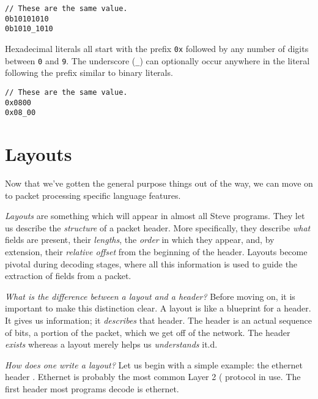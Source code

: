 \begin{codepage}
\begin{lstlisting}
// These are the same value.
0b10101010
0b1010_1010
\end{lstlisting}
\end{codepage}

Hexadecimal literals all start with the prefix \texttt{0x} followed by any number of digits between \texttt{0} and \texttt{9}. The underscore (\texttt{\_}) can optionally occur anywhere in the literal following the prefix similar to binary literals.

\begin{codepage}
\begin{lstlisting}
// These are the same value.
0x0800
0x08_00
\end{lstlisting}
\end{codepage}

\section{Layouts} \label{tut:layout}

Now that we've gotten the general purpose things out of the way, we can move on to packet processing specific language features.

\textit{Layouts} are something which will appear in almost all Steve programs. They let us describe the \textit{structure} of a packet header. More specifically, they describe \textit{what} fields are present, their \textit{lengths}, the \textit{order} in which they appear, and, by extension, their \textit{relative offset} from the beginning of the header. Layouts become pivotal during decoding stages, where all this information is used to guide the extraction of fields from a packet. 

\textit{What is the difference between a layout and a header?} Before moving on, it is important to make this distinction clear. A layout is like a blueprint for a header. It gives us information; it \textit{describes} that header. The header is an actual sequence of bits, a portion of the packet, which we get off of the network. The header \textit{exists} whereas a layout merely helps us \textit{understands} it.d. 

\textit{How does one write a layout?} Let us begin with a simple example: the ethernet header \cite{eth_std}. Ethernet is probably the most common Layer 2 (\cite{osi_model} protocol in use. The first header most programs decode is ethernet.

